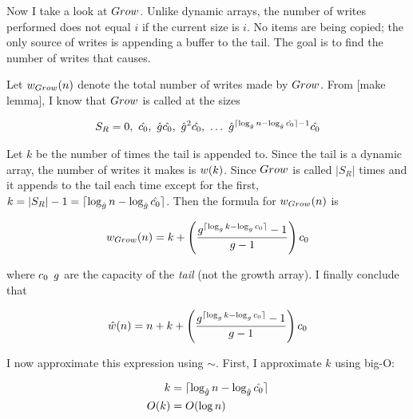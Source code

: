 
Now I take a look at $Grow$. Unlike dynamic arrays, the number of writes performed does not equal $i$ if the current size is $i$. No items are being copied; the only source of writes is appending a buffer to the tail. The goal is to find the number of writes that causes.

Let ${w}_{Grow}(n)$ denote the total number of writes made by $Grow$. From [make lemma], I know that $Grow$ is called at the sizes

\begin{align*}
S_R = 0,\ \VarInitCapacityNew,\ \VarGrowthFactorNew\VarInitCapacityNew,\ \VarGrowthFactorNew^2\VarInitCapacityNew,\ \ldots\ \VarGrowthFactorNew^{\lceil \log_{\VarGrowthFactorNew} n - \log_{\VarGrowthFactorNew} \VarInitCapacityNew \rceil - 1}\VarInitCapacityNew
\end{align*}

Let $k$ be the number of times the tail is appended to. Since the tail is a dynamic array, the number of writes it makes is $w(k)$. Since $Grow$ is called $|S_R|$ times and it appends to the tail each time except for the first, $k = |S_R| - 1 = \lceil \log_{\hat{g}} n - \log_{\hat{g}} \hat{c_0} \rceil$. Then the formula for ${w}_{Grow}(n)$ is

\begin{align*}
{w}_{Grow}(n) = k + \left( \frac{g^{\lceil \log_{g} k - \log_{g} c_0 \rceil} - 1}{g - 1} \right) c_0
\end{align*}

where $c_0$ $g$ are the capacity of the \textit{tail} (not the growth array). I finally conclude that

\begin{align*}
\hat{w}(n) = n + k + \left( \frac{g^{\lceil \log_{g} k - \log_{g} c_0 \rceil} - 1}{g - 1} \right) c_0
\end{align*}

I now approximate this expression using $\sim$. First, I approximate $k$ using big-O:

\begin{align*}
k &= \lceil \log_{\hat{g}} n - \log_{\hat{g}} \hat{c_0} \rceil\\
O(k) &= O(\log n)
\end{align*}

